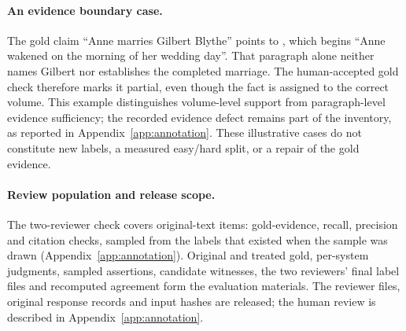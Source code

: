 \paragraph{An evidence boundary case.}
The gold claim ``Anne marries Gilbert Blythe'' points to , which begins
``Anne wakened on the morning of her wedding day''. That paragraph alone neither names
Gilbert nor establishes the completed marriage. The human-accepted gold check
therefore marks it partial, even though the fact is assigned to the correct volume.
This example distinguishes volume-level support from paragraph-level evidence sufficiency;
the recorded evidence defect remains part of the inventory, as reported in
Appendix~\ref{app:annotation}. These illustrative cases do not constitute new labels,
a measured easy/hard split, or a repair of the gold evidence.

\paragraph{Review population and release scope.}
The two-reviewer check covers  original-text items:
 gold-evidence,  recall,
 precision and  citation checks, sampled
from the labels that existed when the sample was drawn (Appendix~\ref{app:annotation}).
Original and treated gold, per-system judgments, sampled assertions, candidate witnesses,
the two reviewers' final label files and recomputed agreement form the evaluation materials. The reviewer files, original response records and input
hashes are released; the human review is described in Appendix~\ref{app:annotation}.

